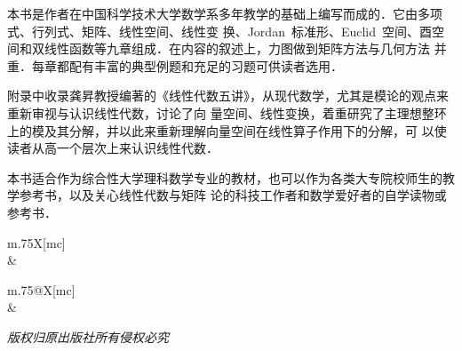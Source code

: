 \begin{changemargin}{8mm}{8mm}
\newbox\CIPInf
\sbox{}
\newbox\COPYRIGHT
\sbox{}
\newbox\TeXlion
\sbox{}
\newbox\GNULogo
\sbox{}

\fzwkai\TeXGyreBonum

本书是作者在中国科学技术大学数学系多年教学的基础上编写而成的．它由多项式、行列式、矩阵、线性空间、线性变
换、Jordan~标准形、Euclid~空间、酉空间和双线性函数等九章组成．在内容的叙述上，力图做到矩阵方法与几何方法
并重．每章都配有丰富的典型例题和充足的习题可供读者选用．

附录中收录龚昇教授编著的《线性代数五讲》，从现代数学，尤其是模论的观点来重新审视与认识线性代数，讨论了向
量空间、线性变换，着重研究了主理想整环上的模及其分解，并以此来重新理解向量空间在线性算子作用下的分解，可
以使读者从高一个层次上来认识线性代数．

本书适合作为综合性大学理科数学专业的教材，也可以作为各类大专院校师生的教学参考书，以及关心线性代数与矩阵
论的科技工作者和数学爱好者的自学读物或参考书．

\centering


\noindent\begin{tabu}{m{.75\linewidth}X[mc]}
  \\
\specialrule{1pt}{1pt}{5pt}
\usebox\CIPInf                 &   \usebox\GNULogo     \\
\specialrule{1pt}{5pt}{0pt}
\end{tabu}


\noindent\begin{tabu}{m{.75\linewidth}@{}X[mc]}
   \\
\specialrule{1pt}{1pt}{5pt}
\usebox\COPYRIGHT              &   \usebox\TeXlion     \\
\specialrule{1pt}{5pt}{5pt}
\end{tabu}

\noindent\normalsize\emph*{版权归原出版社所有\hspace{.8\ccwd}侵权必究}\hfill\mbox{}
\end{changemargin}
